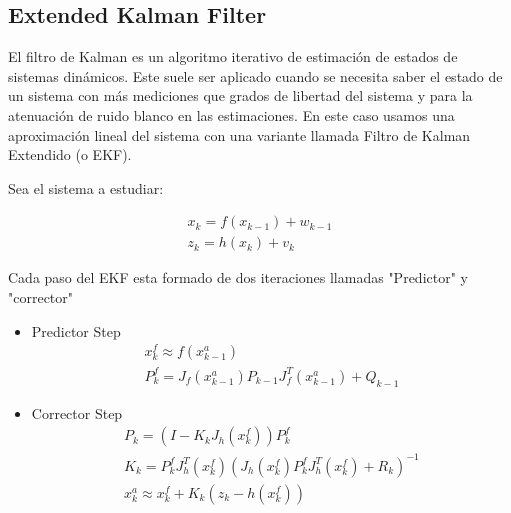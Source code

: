 	
\subsection{Extended Kalman Filter}

El filtro de Kalman es un algoritmo iterativo de estimaci\'on de estados de sistemas din\'amicos. Este suele ser aplicado cuando se necesita saber el estado de un sistema con m\'as mediciones que grados de libertad del sistema y para la atenuaci\'on de ruido blanco en las estimaciones. En este caso usamos una aproximaci\'on lineal del sistema con una variante llamada Filtro de Kalman Extendido \cite{GabrielTerejanu_EKF} (o EKF).

Sea el sistema a estudiar:

\begin{gather}
x_k = f(x_{k-1}) + w_{k-1} \\
z_k = h(x_k) + v_k
\end{gather}

Cada paso del EKF esta formado de dos iteraciones llamadas "Predictor" y "corrector"

\begin{itemize}
   \item Predictor Step
		\begin{gather}
			x_k^{f} \approx f(x_{k-1}^{a}) \\
			P_k^{f} = J_f(x_{k-1}^{a}) P_{k-1} J_f^{T}(x_{k-1}^{a}) + Q_{k-1}
		\end{gather}

	\item Corrector Step
		\begin{gather}
			P_k = (I - K_k J_h(x_k^{f}))P_k^{f} \\
			K_k = P_k^{f} J^{T}_h(x_k^{f}) (J_h(x_k^{f}) P_k^{f} J_h^{T}(x_k ^{f}) + R_k)^{-1} \\
			x_k^{a} \approx x_k^{f} + K_k (z_k - h(x_k^{f}))
		\end{gather}
\end{itemize}